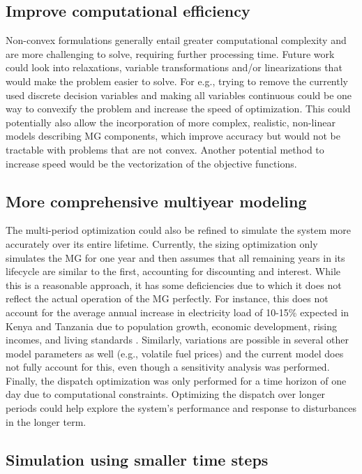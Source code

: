 \documentclass[final,3p,times]{elsarticle}
\begin{document}
\subsection{Improve computational efficiency}

Non-convex formulations generally entail greater computational complexity and are more challenging to solve, requiring further processing time. Future work could look into relaxations, variable transformations and/or linearizations that would make the problem easier to solve. For e.g., trying to remove the currently used discrete decision variables and making all variables continuous could be one way to convexify the problem and increase the speed of optimization. This could potentially also allow the incorporation of more complex, realistic, non-linear models describing MG components, which improve accuracy but would not be tractable with problems that are not convex. Another potential method to increase speed would be the vectorization of the objective functions.

\subsection{More comprehensive multiyear modeling}

The multi-period optimization could also be refined to simulate the system more accurately over its entire lifetime. Currently, the sizing optimization only simulates the MG for one year and then assumes that all remaining years in its lifecycle are similar to the first, accounting for discounting and interest. While this is a reasonable approach, it has some deficiencies due to which it does not reflect the actual operation of the MG perfectly. For instance, this does not account for the average annual increase in electricity load of 10-15\% expected in Kenya and Tanzania due to population growth, economic development, rising incomes, and living standards \cite{usea}. Similarly, variations are possible in several other model parameters as well (e.g., volatile fuel prices) and the current model does not fully account for this, even though a sensitivity analysis was performed. Finally, the dispatch optimization was only performed for a time horizon of one day due to computational constraints. Optimizing the dispatch over longer periods could help explore the system's performance and response to disturbances in the longer term. 

\subsection{Simulation using smaller time steps}
\end{document}
